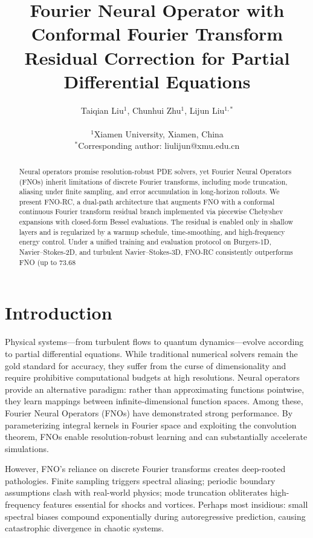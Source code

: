 \documentclass[11pt]{article}
\title{\textbf{Fourier Neural Operator with Conformal Fourier Transform Residual Correction for Partial Differential Equations}}
\author{
    Taiqian Liu$^{1}$, Chunhui Zhu$^{1}$, Lijun Liu$^{1,*}$ \\
    \\
    $^{1}$Xiamen University, Xiamen, China \\
    $^{*}$Corresponding author: liulijun@xmu.edu.cn
}
\date{}
\begin{document}
\maketitle

\begin{abstract}
Neural operators promise resolution-robust PDE solvers, yet Fourier Neural Operators (FNOs) inherit limitations of discrete Fourier transforms, including mode truncation, aliasing under finite sampling, and error accumulation in long-horizon rollouts. We present FNO‑RC, a dual‑path architecture that augments FNO with a conformal continuous Fourier transform residual branch implemented via piecewise Chebyshev expansions with closed‑form Bessel evaluations. The residual is enabled only in shallow layers and is regularized by a warmup schedule, time‑smoothing, and high‑frequency energy control. Under a unified training and evaluation protocol on Burgers‑1D, Navier–Stokes‑2D, and turbulent Navier–Stokes‑3D, FNO‑RC consistently outperforms FNO (up to 73.68%
\end{abstract}

\section{Introduction}

Physical systems—from turbulent flows to quantum dynamics—evolve according to partial differential equations. While traditional numerical solvers remain the gold standard for accuracy, they suffer from the curse of dimensionality and require prohibitive computational budgets at high resolutions. Neural operators \citep{kovachki2021neural,lu2021learning} provide an alternative paradigm: rather than approximating functions pointwise, they learn mappings between infinite-dimensional function spaces. Among these, Fourier Neural Operators (FNOs) \citep{Li2020FNO} have demonstrated strong performance. By parameterizing integral kernels in Fourier space and exploiting the convolution theorem, FNOs enable resolution-robust learning and can substantially accelerate simulations.

However, FNO's reliance on discrete Fourier transforms creates deep-rooted pathologies. Finite sampling triggers spectral aliasing; periodic boundary assumptions clash with real-world physics; mode truncation obliterates high-frequency features essential for shocks and vortices. Perhaps most insidious: small spectral biases compound exponentially during autoregressive prediction, causing catastrophic divergence in chaotic systems.
\end{document}
